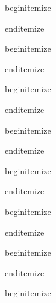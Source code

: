 begin{itemize}
			\item
			\item
			\item
			\item
			\item

end{itemize}


begin{itemize}
			\item
			\item
			\item
			\item
			\item

end{itemize}


begin{itemize}
			\item
			\item
			\item
			\item
			\item

end{itemize}



begin{itemize}
			\item
			\item
			\item
			\item
			\item

end{itemize}



begin{itemize}
			\item
			\item
			\item
			\item
			\item

end{itemize}


begin{itemize}
			\item
			\item
			\item
			\item
			\item

end{itemize}


begin{itemize}
			\item
			\item
			\item
			\item
			\item

end{itemize}


begin{itemize}
			\item
			\item
			\item
			\item
			\item

